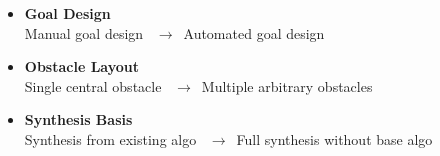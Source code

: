 \begin{frame}{}

\vspace{0.4cm}

\begin{itemize}\setlength\itemsep{0.6cm}
    \item<1-> \textbf{Goal Design}\\
              \textcolor{softgray}{\small Manual goal design} \ $\longrightarrow$\  \textcolor{accent}{\small Automated goal design}
              
    \item<2-> \textbf{Obstacle Layout}\\
              \textcolor{softgray}{\small Single central obstacle} \ $\longrightarrow$\  \textcolor{accent}{\small Multiple arbitrary obstacles}
              
    \item<3-> \textbf{Synthesis Basis}\\
              \textcolor{softgray}{\small Synthesis from existing algo} \ $\longrightarrow$\  \textcolor{accent}{\small Full synthesis without base algo}
\end{itemize}

\end{frame}

